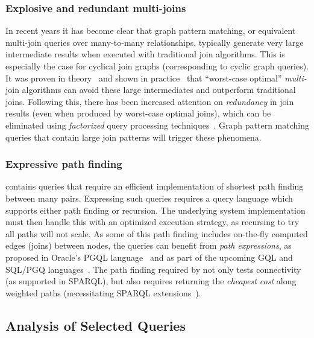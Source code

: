 \subsubsection{Explosive and redundant multi-joins}
In recent years it has become clear that graph pattern matching, or equivalent multi-join queries over many-to-many relationships, typically generate very large intermediate results when executed with traditional join algorithms. This is especially the case for cyclical join graphs (corresponding to cyclic graph queries). %
It was proven in theory~\cite{DBLP:journals/sigmod/NgoRR13} and shown in practice~\cite{DBLP:journals/corr/abs-1210-0481,DBLP:journals/pvldb/MhedhbiS19,DBLP:journals/pvldb/FreitagBSKN20} that ``worst-case optimal'' {\em multi-}join algorithms can avoid these large intermediates and outperform traditional joins. Following this, there has been increased attention on {\em redundancy} in join results (even when produced by worst-case optimal joins), which can be eliminated using {\em factorized} query processing techniques~\cite{DBLP:journals/pvldb/BakibayevOZ12,DBLP:journals/sigmod/OlteanuS16,DBLP:journals/pvldb/GuptaMS21}.
Graph pattern matching queries that contain large join patterns will trigger these phenomena.

\subsubsection{Expressive path finding}
\snbbi contains queries that require an efficient implementation of shortest path finding between many pairs.
Expressing such queries requires a query language which supports either path finding or recursion. The underlying system implementation must then handle this with an optimized execution strategy, as recursing to try all paths will not scale.
As some of this path finding includes on-the-fly computed edges (joins) between nodes, the queries can benefit from {\em path expressions}, as proposed in Oracle's PGQL language~\cite{DBLP:conf/grades/RestHKMC16} and as part of the upcoming GQL and SQL/PGQ languages~\cite{DBLP:conf/sigmod/DeutschFGHLLLMM22}.
The path finding required by \snbbi not only tests connectivity (as supported in SPARQL), but also requires returning the {\em cheapest cost} along weighted paths (necessitating SPARQL extensions~\cite{DBLP:conf/bigdataconf/MizellMR14}).

\subsection{Analysis of Selected Queries}
\label{sec:example-queries}

